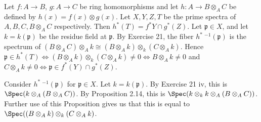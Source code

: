 \begin{questions}
\begin{solution}
\end{solution}

\question Let $f:A\to B $, $g:A\to C $ be ring homomorphisms and let $h: A \to B \otimes _A C $ be defined by $h(x) = f(x) \otimes g(x) $. Let $X,Y,Z,T $ be the prime spectra of $A,B,C,B \otimes _A C $ respectively. Then $h^\ast(T) = f^\ast Y \cap g^\ast(Z) $.
\ifhint
	Let $\mathfrak{p} \in X $, and let $k = k(\mathfrak{p}) $ be the residue field at $\mathfrak{p} $.
	By Exercise 21, the fiber $h^\ast\ ^{-1}(\mathfrak{p}) $ is the spectrum of $(B \otimes _A C) \otimes _A k \cong (B \otimes _A k) \otimes _k (C \otimes _A k) $.
	Hence $\mathfrak{p} \in h^\ast(T) \iff (B \otimes _A k) \otimes _k (C \otimes _A k) \ne 0 \iff B \otimes _A k \ne 0 $ and $C \otimes _A k \ne 0 \iff \mathfrak{p}\in f^\ast(Y) \cap g^\ast(Z)$.
\fi
\begin{solution}
	Consider $h^\ast\ ^{-1}(\mathfrak{p}) $ for $\mathfrak{p} \in X $.
	Let $k = k(\mathfrak{p}) $.
	By Exercise 21 iv, this is $\Spec(k \otimes _A (B \otimes _A C))$.
	By Proposition 2.14, this is $\Spec(k \otimes _k k \otimes _A (B \otimes _A C))$.
	Further use of this Proposition gives us that this is equal to $\Spec((B \otimes _A k) \otimes _k (C \otimes _A k)$.


\end{solution}
\end{questions}
